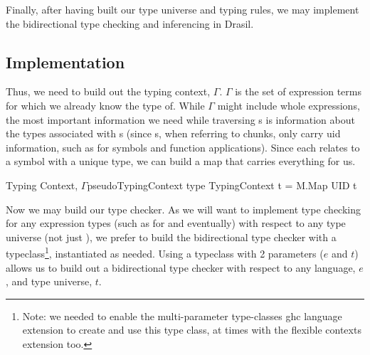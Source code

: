 Finally, after having built our type universe and typing rules, we may implement
the bidirectional type checking and inferencing in Drasil.

\subsection{Implementation}
\label{chap:typed-expr:sec:typing-the-expression-language:subsec:implementation}


Thus, we need to build out the typing context, \(\Gamma\). \(\Gamma\) is the set
of expression terms for which we already know the type of. While \(\Gamma\)
might include whole expressions, the most important information we need while
traversing \Expr{}s is information about the types associated with \UID{}s
(since \Expr{}s, when referring to chunks, only carry \acs{uid} information,
such as for symbols and function applications). Since each \UID{} relates to a
symbol with a unique type, we can build a map that carries everything for us.

\begin{pseudohaskell}{Typing Context, \(\Gamma\)}{pseudoTypingContext}
type TypingContext t = M.Map UID t
\end{pseudohaskell}

Now we may build our type checker. As we will want to implement type checking
for any expression types (such as for \CodeExpr{} and \ModelExpr{} eventually)
with respect to any type universe (not just \Space{}), we prefer to build the
bidirectional type checker with a typeclass\footnote{Note: we needed to enable
the multi-parameter type-classes \acs{ghc} language extension to create and use
this type class, at times with the flexible contexts extension too.}, instantiated as
needed. Using a typeclass with 2 parameters (\(e\) and \(t\)) allows us to build
out a bidirectional type checker with respect to any language, \(e\), and type
universe, \(t\).

